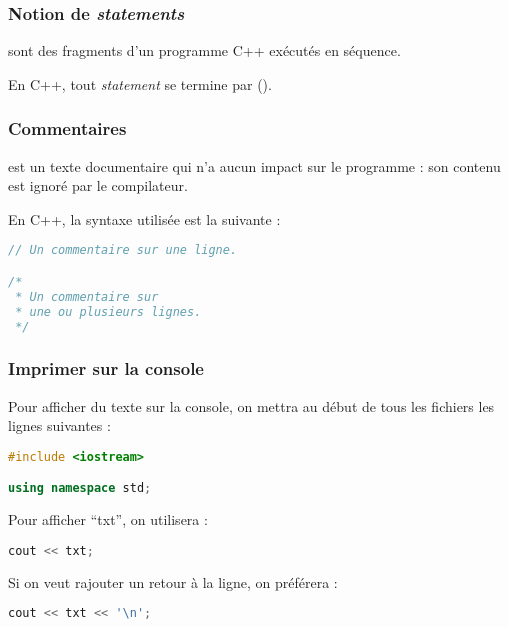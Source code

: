 \documentclass{cppcourses}
\begin{document}
\begin{frame}

\frametitle{Notion de \emph{statements}}

\begin{definition}
 sont des fragments d'un programme C++ exécutés en séquence.
\end{definition}

En C++, tout \emph{statement} se termine par  (\myimp{\mykeyword{;}}).


\end{frame}

\begin{frame}[fragile]

\frametitle{Commentaires}

\begin{definition}
 est un texte documentaire qui n'a aucun impact sur le programme : son contenu est ignoré par le compilateur.
\end{definition}

En C++, la syntaxe utilisée est la suivante :

\begin{lstlisting}[language = c++]
// Un commentaire sur une ligne.

/*
 * Un commentaire sur
 * une ou plusieurs lignes.
 */
\end{lstlisting}

\end{frame}

\begin{frame}[fragile]

\frametitle{Imprimer sur la console}

Pour afficher du texte sur la console, on mettra au début de tous les fichiers les lignes suivantes :

\begin{lstlisting}[language = c++]
#include <iostream>

using namespace std;
\end{lstlisting}

Pour afficher \enquote{txt}, on utilisera :

\begin{lstlisting}[language = c++]
cout << txt;
\end{lstlisting}

Si on veut rajouter un retour à la ligne, on préférera :

\begin{lstlisting}[language = c++]
cout << txt << '\n';
\end{lstlisting}

\end{frame}
\end{document}
